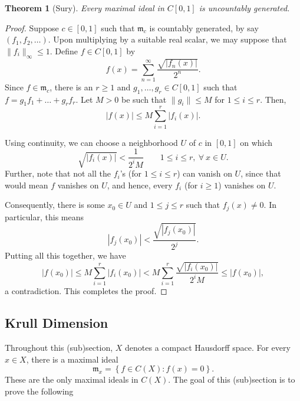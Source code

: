\documentclass[12pt]{article}
\theoremstyle{thmstyle}
\newtheorem{theorem}{Theorem}[section]
\theoremstyle{defstyle}
\newcommand{\frakm}{\mathfrak{m}} %
\renewcommand{\le}{\leqslant}
\renewcommand{\ge}{\geqslant}
\begin{document}
\begin{theorem}[Sury]
    Every maximal ideal in $C[0, 1]$ is uncountably generated.
\end{theorem}
\begin{proof}
    Suppose $c\in [0, 1]$ such that $\frakm_c$ is countably generated, by say $(f_1, f_2,\dots)$. Upon multiplying by a suitable real scalar, we may suppose that $\|f_i\|_\infty\le 1$. Define $f\in C[0, 1]$ by 
    \begin{equation*}
        f(x) = \sum_{n = 1}^\infty\frac{\sqrt{|f_n(x)|}}{2^n}.
    \end{equation*}
    Since $f\in\frakm_c$, there is an $r\ge 1$ and $g_1,\dots,g_r\in C[0, 1]$ such that $f = g_1f_1 + \dots + g_rf_r$. Let $M > 0$ be such that $\|g_i\|\le M$ for $1\le i\le r$. Then, 
    \begin{equation*}
        |f(x)|\le M\sum_{i = 1}^r |f_i(x)|.
    \end{equation*}

    Using continuity, we can choose a neighborhood $U$ of $c$ in $[0, 1]$ on which 
    \begin{equation*}
        \sqrt{|f_i(x)|} < \frac{1}{2^i M}\qquad 1\le i\le r,~\forall~x\in U.
    \end{equation*}
    Further, note that not all the $f_i$'s (for $1\le i\le r$) can vanish on $U$, since that would mean $f$ vanishes on $U$, and hence, every $f_i$ (for $i\ge 1$) vanishes on $U$.

    Consequently, there is some $x_0\in U$ and $1\le j\le r$ such that $f_j(x)\ne 0$. In particular, this means 
    \begin{equation*}
        |f_j(x_0)| < \frac{\sqrt{|f_j(x_0)|}}{2^j}.
    \end{equation*}
    Putting all this together, we have 
    \begin{equation*}
        |f(x_0)|\le M\sum_{i = 1}^r |f_i(x_0)| < M\sum_{i = 1}^r\frac{\sqrt{|f_i(x_0)|}}{2^i M}\le |f(x_0)|,
    \end{equation*}
    a contradiction. This completes the proof.
\end{proof}

\subsection{Krull Dimension}

Throughout this (sub)section, $X$ denotes a compact Hausdorff space. For every $x\in X$, there is a maximal ideal 
\begin{equation*}
    \frakm_x = \left\{f\in C(X)\colon f(x) = 0\right\}.
\end{equation*}
These are the only maximal ideals in $C(X)$. The goal of this (sub)section is to prove the following 
\end{document}
